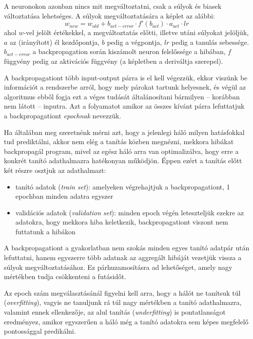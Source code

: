 A neuronokon azonban nincs mit megváltoztatni, csak a súlyok és biasek változtatása lehetséges. A súlyok megváltoztatására a képlet az alábbi:
$$ w_{new} =  w_{old} + b_{act-error} \cdot f'(b_{act}) \cdot a_{act} \cdot lr $$
ahol $w$-vel jelölt értékekkel, a megváltoztatás előtti, illetve utáni súlyokat jelöljük, $a$ az (irányított) él kezdőpontja, $b$ pedig a végpontja, $lr$ pedig a tanulás sebessége. $b_{act-error}$ a backpropagation során kiszámolt neuron felelőssége a hibában, $f$ függvény pedig az aktivációs függvény (a képletben a deriváltja szerepel).

A backpropagationt több input-output párra is el kell végezzük, ekkor viszünk be információt a rendszerbe arról, hogy mely párokat tartunk helyesnek, és végül az algoritmus ebből fogja ezt a véges tudását általánosítani bármilyen -- korábban nem látott -- inputra. Azt a folyamatot amikor az összes kívánt párra lefuttatjuk a backpropagationt \emph{epochnak} nevezzük. 

Ha általában meg szeretnénk mérni azt, hogy a jelenlegi háló milyen hatásfokkal tud prediktálni, akkor nem elég a tanítás közben megnézni, mekkora hibákat backpropagál program, mivel az egész háló arra van optimalizálva, hogy erre a konkrét tanító adathalmazra hatékonyan működjön. Éppen ezért a tanítás előtt két részre osztjuk az adathalmazt:

\begin{itemize}  
	\item tanító adatok (\emph{train set}): amelyeken végrehajtjuk a backpropagationt, 1 epochban minden adatra egyszer
	\item validációs adatok (\emph{validation set}): minden epoch végén leteszteljük ezekre az adatokra, hogy mekkora hiba keletkezik, backpropagationt viszont nem futtatunk a hibákon
\end{itemize}

A backpropagationt a gyakorlatban nem szokás minden egyes tanító adatpár után lefuttatni, hanem egyszerre több adatnak az aggregált hibáját vezetjük vissza a súlyok megváltoztatásához. Ez párhuzamosításra ad lehetőséget, amely nagy mértékben tudja csökkenteni a futásidőt.

Az epoch szám megválasztásánál figyelni kell arra, hogy a hálót ne tanítsuk túl (\emph{overfitting}), vagyis ne tanuljunk rá túl nagy mértékben a tanító adathalmazra, valamint ennek ellenkezője, az alul tanítás (\emph{underfitting}) is pontatlanságot eredményez, amikor egyszerűen a háló még a tanító adatokra sem képes megfelelő pontossággal predikálni.

